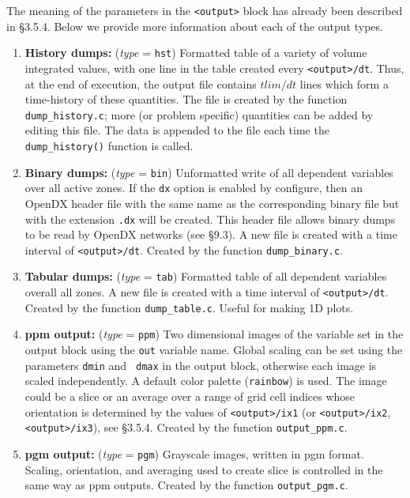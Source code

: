 The meaning of the parameters in the {\tt <output>} block has already been
described in \S 3.5.4.  Below we provide more information about each of the
output types.
\begin{enumerate}

\item {\bf History dumps:} ({\em type} = {\tt hst}) Formatted
table of a variety of volume integrated values, with one line in the
table created every {\tt <output>/dt}.  Thus, at the end of execution, the
output file contains $tlim/dt$ lines which form a time-history of these
quantities.  The file is created by the function {\tt dump\_history.c};
more (or problem specific) quantities can be added by editing this file.
The data is appended to the file each time the {\tt dump\_history()}
function is called.

\item {\bf Binary dumps:} ({\em type} = {\tt bin}) Unformatted
write of all dependent variables over all active zones.  If the {\tt dx}
option is enabled by configure, then an OpenDX header file with the same
name as the corresponding binary file but with the extension {\tt .dx}
will be created.  This header file allows binary dumps to be read by
OpenDX networks (see \S9.3).  A new file is created with a time interval
of {\tt <output>/dt}.  Created by the function {\tt dump\_binary.c}.

\item {\bf Tabular dumps:} ({\em type} = {\tt tab}) Formatted
table of all dependent variables overall all zones.  A new file is
created with a time interval of {\tt <output>/dt}.
Created by the function {\tt dump\_table.c}.  Useful for making 1D plots.

\item {\bf  ppm output:} ({\em type} = {\tt ppm}) Two dimensional images of
the variable set in the output block using the {\tt out} variable name.
Global scaling can be set using the parameters {\tt dmin} and {\tt
dmax} in the output block, otherwise each image is scaled independently.
A default color palette ({\tt rainbow}) is used.  The image could be a
slice or an average over a range of grid cell indices whose orientation
is determined by the
values of {\tt <output>/ix1} (or {\tt <output>/ix2}, {\tt <output>/ix3}), 
see \S 3.5.4.  Created by the function
{\tt output\_ppm.c}.

\item {\bf  pgm output:} ({\em type} = {\tt pgm}) Grayscale images,
written in pgm format.  Scaling, orientation, and averaging used to
create slice is controlled in the same way as ppm outputs.
Created by the function {\tt output\_pgm.c}.


\end{enumerate}
